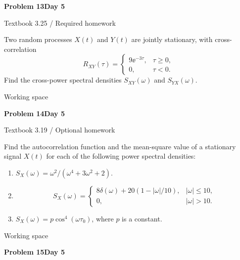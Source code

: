 \documentclass[11pt]{article}
\newcommand{\qtitle}[2]{\clearpage\begin{tcolorbox}[colback=navy,colframe=navy,arc=1.5pt,boxrule=0pt]\color{white}\large\bfseries #1\hfill\small #2\end{tcolorbox}}
\begin{document}
\qtitle{Problem 13}{Day 5}
{\small\color{accentred}Textbook 3.25 / Required homework}\par{}\par{}\par\smallskip\begin{tcolorbox}[colback=qbg,colframe=qbg,boxrule=0pt]Two random processes $X(t)$ and $Y(t)$ are jointly stationary, with cross-correlation
\[R_{XY}(\tau)=\begin{cases}9\ee^{-3\tau},&\tau\geq0,\\0,&\tau<0.\end{cases}\]
Find the cross-power spectral densities $S_{XY}(\omega)$ and $S_{YX}(\omega)$.\end{tcolorbox}\smallskip\begin{workspace}\hfill{\color{linec}\footnotesize Working space}\end{workspace}
\qtitle{Problem 14}{Day 5}
{\small\color{accentred}Textbook 3.19 / Optional homework}\par{}\par{}\par\smallskip\begin{tcolorbox}[colback=qbg,colframe=qbg,boxrule=0pt]Find the autocorrelation function and the mean-square value of a stationary signal $X(t)$ for each of the following power spectral densities:
\begin{enumerate}
\item $S_X(\omega)=\omega^2/(\omega^4+3\omega^2+2)$.
\item
\[S_X(\omega)=\begin{cases}8\delta(\omega)+20(1-|\omega|/10),&|\omega|\leq10,\\0,&|\omega|>10.\end{cases}\]
\item $S_X(\omega)=p\cos^4(\omega\tau_0)$, where $p$ is a constant.
\end{enumerate}\end{tcolorbox}\smallskip\begin{workspace}\hfill{\color{linec}\footnotesize Working space}\end{workspace}
\qtitle{Problem 15}{Day 5}
\end{document}
